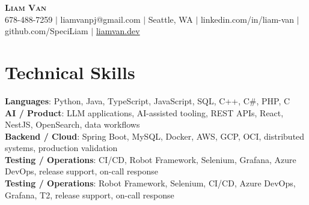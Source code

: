 \documentclass[letterpaper,11pt]{article}
\begin{document}

%
\begin{center}
    \textbf{\Huge \scshape Liam Van} \\ \vspace{1pt}
    \small 678-488-7259 $|$ liamvanpj@gmail.com $|$ Seattle, WA $|$
    linkedin.com/in/liam-van $|$ github.com/SpeciLiam $|$ \href{https://liamvan.dev}{liamvan.dev}

\end{center}

\section{Technical Skills}
 \begin{itemize}[leftmargin=0.15in, label={}]
    \small{\item{
     \textbf{Languages}{: Python, Java, TypeScript, JavaScript, SQL, C++, C\#, PHP, C} \\
     \textbf{AI / Product}{: LLM applications, AI-assisted tooling, REST APIs, React, NestJS, OpenSearch, data workflows} \\
     \textbf{Backend / Cloud}{: Spring Boot, MySQL, Docker, AWS, GCP, OCI, distributed systems, production validation} \\
     \textbf{Testing / Operations}{: CI/CD, Robot Framework, Selenium, Grafana, Azure DevOps, release support, on-call response} \\
     \textbf{Testing / Operations}{: Robot Framework, Selenium, CI/CD, Azure DevOps, Grafana, T2, release support, on-call response} \\
    }}
 \end{itemize}
%
\end{document}
